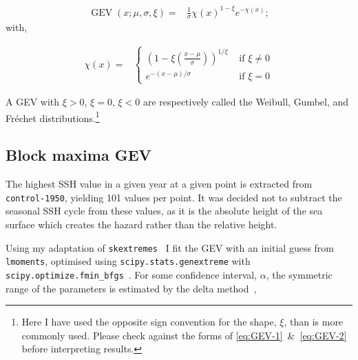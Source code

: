     \begin{align}
    \operatorname{GEV}(x; \mu, \sigma, \xi)=&
    \frac{1}{\sigma} \chi(x)^{1-\xi} e^{-\chi(x)}; \tag{GEV-1}
    \label{eq:GEV-1}
    \end{align}
    with,
    \iffalse
    \begin{align}
        \chi(x)=&\{
               \begin{array}{ll}
                    \left(1- \xi\left(\frac{x-
                    \mu}{\sigma} \right)\right)^{\frac{1}{\xi}} &
                     \text { if } \xi \neq 0 \\
                    e^{-\frac{x-\mu}{\sigma}} &
                    \text { if } \xi=0 \\

              \end{array}.
    \tag{GEV-2} \label{eq:GEV-2}

    \end{align}
    \fi
\begin{align}
    \chi(x)=&\left\{\begin{array}{ll}
    \left(1-\xi\left(\frac{x-\mu}{\sigma}\right)\right)^{1 / \xi} & \text { if } \xi \neq 0 \\
    e^{-(x-\mu) / \sigma} & \text { if } \xi=0 \tag{GEV-2}
    \end{array}\right.
   \label{eq:GEV-2}
\end{align}


    A GEV with $\xi>0$, $\xi=0$, $\xi<0$ are
    respectively called the Weibull, Gumbel, and Fr\'echet
    distributions.\footnote{Here I have used the opposite sign convention for
    the shape, $\xi$, than is more commonly used. Please check against the
    forms of \ref{eq:GEV-1}~\&~\ref{eq:GEV-2} before interpreting results. }

\subsection{Block maxima GEV}
The highest SSH value in a given year at a given point
is extracted from \texttt{control-1950}, yielding 101 values per point.
It was decided not to subtract the seasonal SSH cycle from these
values, as it is the absolute height of the sea surface which
creates the hazard rather than the relative height.






Using my adaptation of \texttt{skextremes}~\cite{skextremes} I fit the
GEV with an initial guess from \texttt{lmoments}, optimised using
\texttt{scipy.stats.genextreme} with \texttt{scipy.optimize.fmin\_bfgs}~\cite{2020SciPy-NMeth}.
For some confidence interval, $\alpha$, the symmetric range of the parameters is
estimated by the delta method~\cite{coles2001introduction},

